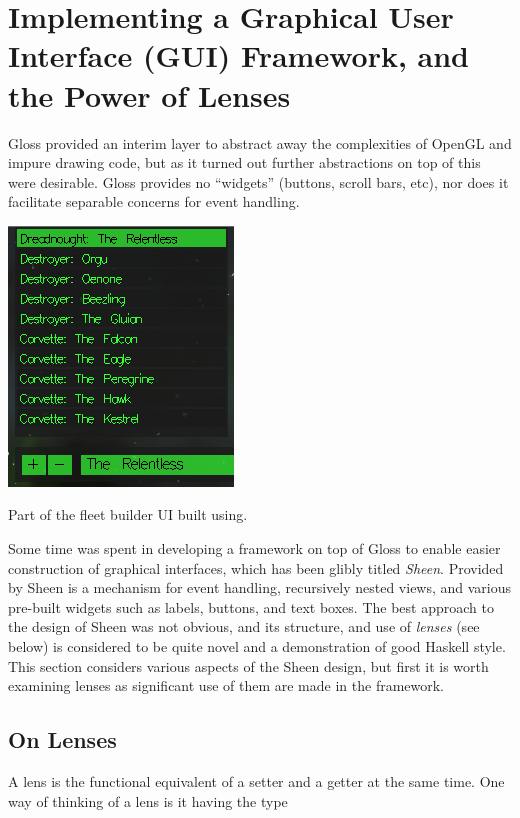 \section{Implementing a Graphical User Interface (GUI) Framework, and the Power of Lenses}
\label{sec:gui}

Gloss provided an interim layer to abstract away the complexities of OpenGL and impure drawing code, but as it turned out further abstractions on top of this were desirable. Gloss provides no ``widgets'' (buttons, scroll bars, etc), nor does it facilitate separable concerns for event handling.

\begin{marginfigure}
	\includegraphics{res/sheen/fleetbuilder1.png}
	\caption[Fleet builder UI built using Sheen]{Part of the fleet builder UI built using.}
	\label{fig:openglbasicout}
\end{marginfigure}

Some time was spent in developing a framework on top of Gloss to enable easier construction of graphical interfaces, which has been glibly titled \emph{Sheen}. Provided by Sheen is a mechanism for event handling, recursively nested views, and various pre-built widgets such as labels, buttons, and text boxes. The best approach to the design of Sheen was not obvious, and its structure, and use of \emph{lenses} (see below) is considered to be quite novel and a demonstration of good Haskell style. This section considers various aspects of the Sheen design, but first it is worth examining lenses as significant use of them are made in the framework.

\subsection{On Lenses}

A lens is the functional equivalent of a setter and a getter at the same time. One way of thinking of a lens is it having the type

